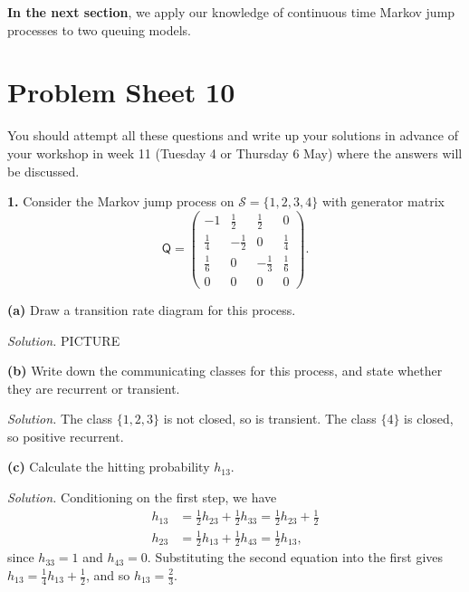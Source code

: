 \documentclass[
  a4paper,
]{article}
\newif\ifcomm\commtrue
\theoremstyle{definition}
\theoremstyle{definition}
\theoremstyle{definition}
\theoremstyle{remark}
\begin{document}
\textbf{In the next section}, we apply our knowledge of continuous time Markov jump processes to two queuing models.

\hypertarget{P10}{%
\section*{Problem Sheet 10}\label{P10}}

\commtrue

You should attempt all these questions and write up your solutions in advance of your workshop in week 11 (Tuesday 4 or Thursday 6 May) where the answers will be discussed.

\textbf{1.} Consider the Markov jump process on \(\mathcal S = \{1,2,3,4\}\) with generator matrix
\[ \mathsf Q = \begin{pmatrix} -1 & \frac12 & \frac12 & 0 \\
                               \frac14 & -\frac12 & 0 & \frac14 \\  
                               \frac16 & 0 & -\frac13 & \frac16 \\
                               0 & 0 & 0 & 0  \end{pmatrix} . \]

\textbf{(a)} Draw a transition rate diagram for this process.

\begin{myanswers}
\emph{Solution.}
PICTURE

\end{myanswers}

\textbf{(b)} Write down the communicating classes for this process, and state whether they are recurrent or transient.

\begin{myanswers}
\emph{Solution.}
The class \(\{1,2,3\}\) is not closed, so is transient. The class \(\{4\}\) is closed, so positive recurrent.

\end{myanswers}

\textbf{(c)} Calculate the hitting probability \(h_{13}\).

\begin{myanswers}
\emph{Solution.}
Conditioning on the first step, we have
\begin{align*}
h_{13} &= \tfrac12 h_{23} + \tfrac12 h_{33} = \tfrac12 h_{23} + \tfrac12 \\
h_{23} &= \tfrac12 h_{13} + \tfrac12 h_{43} = \tfrac12 h_{13} ,
\end{align*}
since \(h_{33} = 1\) and \(h_{43} = 0\).
Substituting the second equation into the first gives
\(h_{13} = \tfrac14 h_{13} + \tfrac12\), and so \(h_{13} = \frac23\).

\end{myanswers}
\end{document}
